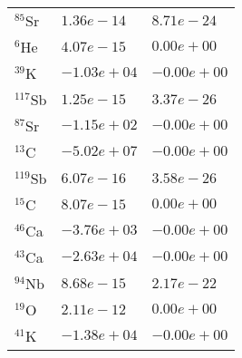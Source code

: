 \begin{tabular}{lll}
 $^{85}$Sr  & $1.36e-14 $                                                        & $8.71e-24 $                                                                     \\
 $^{6}$He   & $4.07e-15 $                                                        & $0.00e+00 $                                                                     \\
 $^{39}$K   & $-1.03e+04 $                                                       & $-0.00e+00 $                                                                    \\
 $^{117}$Sb & $1.25e-15 $                                                        & $3.37e-26 $                                                                     \\
 $^{87}$Sr  & $-1.15e+02 $                                                       & $-0.00e+00 $                                                                    \\
 $^{13}$C   & $-5.02e+07 $                                                       & $-0.00e+00 $                                                                    \\
 $^{119}$Sb & $6.07e-16 $                                                        & $3.58e-26 $                                                                     \\
 $^{15}$C   & $8.07e-15 $                                                        & $0.00e+00 $                                                                     \\
 $^{46}$Ca  & $-3.76e+03 $                                                       & $-0.00e+00 $                                                                    \\
 $^{43}$Ca  & $-2.63e+04 $                                                       & $-0.00e+00 $                                                                    \\
 $^{94}$Nb  & $8.68e-15 $                                                        & $2.17e-22 $                                                                     \\
 $^{19}$O   & $2.11e-12 $                                                        & $0.00e+00 $                                                                     \\
 $^{41}$K   & $-1.38e+04 $                                                       & $-0.00e+00 $                                                                    \\

\end{tabular}
